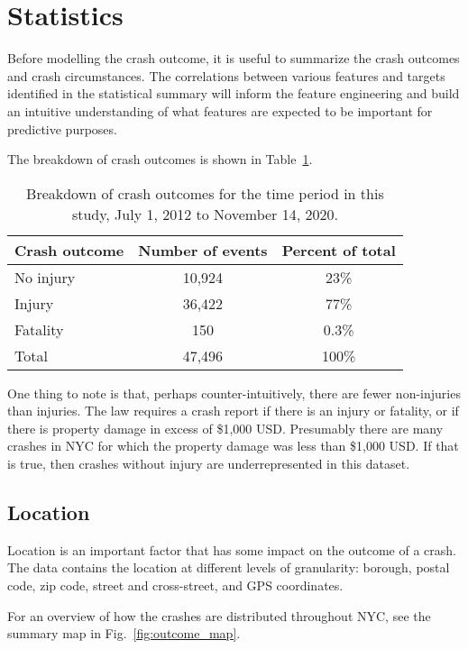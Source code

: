 \documentclass[twocolumn,oneside]{article}
\begin{document}
\section{Statistics}

Before modelling the crash outcome, it is useful to summarize the
crash outcomes and crash circumstances.  The correlations between
various features and targets identified in the statistical summary
will inform the feature engineering and build an intuitive
understanding of what features are expected to be important for
predictive purposes.

The breakdown of crash outcomes is shown in
Table~\ref{tab:crash_numbers}.

\begin{table}[h]
\centering
\begin{tabular}{l | c | c}
\hline \hline
Crash outcome & Number of events & Percent of total \\
\hline \hline
No injury  & 10,924 &  23\% \\ 
Injury     & 36,422 &  77\%  \\ 
Fatality   &    150 &  0.3\%  \\ \hline
Total      & 47,496 &  100\% \\
  \hline \hline
\end{tabular}
\caption{Breakdown of crash outcomes for the time period in this
  study, July 1, 2012 to November 14, 2020.}
\label{tab:crash_numbers}
\end{table}

One thing to note is that, perhaps counter-intuitively, there are
fewer non-injuries than injuries.  The law requires a crash report if
there is an injury or fatality, or if there is property damage in
excess of \$1,000 USD.  Presumably there are many crashes in NYC for
which the property damage was less than \$1,000 USD.  If that is true,
then crashes without injury are underrepresented in this dataset.

\subsection{Location}

Location is an important factor that has some impact on the outcome of
a crash.  The data contains the location at different levels of
granularity: borough, postal code, zip code, street and cross-street,
and GPS coordinates.

For an overview of how the crashes are distributed throughout NYC, see
the summary map in Fig.~\ref{fig:outcome_map}.
\end{document}

